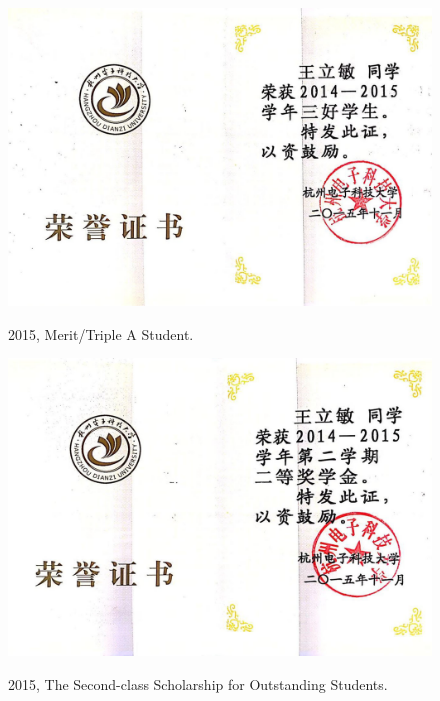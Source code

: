 \documentclass[11pt]{article}
\begin{document}
{\begin{figure}[ht]
	\centering
	\includegraphics[width=14cm]{fig/cer3.jpg}\\
	\caption{2015, Merit/Triple A Student.}
\end{figure}

\begin{figure}[ht]
	\centering
	\includegraphics[width=14cm]{fig/cer4.jpg}\\
	\caption{2015, The Second-class Scholarship for Outstanding Students.}
\end{figure}

}
\end{document}
